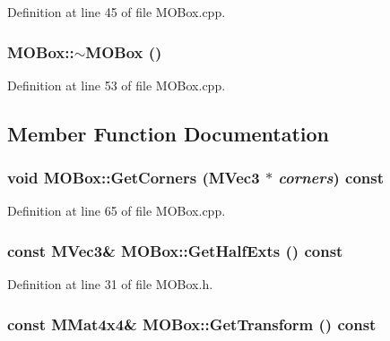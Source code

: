 Definition at line 45 of file MOBox.cpp.\hypertarget{class_m_o_box_5d831d82a6f18ceb4ded4f0aead4d37e}{
\subsubsection[{$\sim$MOBox}]{\setlength{\rightskip}{0pt plus 5cm}MOBox::$\sim$MOBox ()}}
\label{class_m_o_box_5d831d82a6f18ceb4ded4f0aead4d37e}




Definition at line 53 of file MOBox.cpp.

\subsection{Member Function Documentation}
\hypertarget{class_m_o_box_d4ab62fb0cb55df4774b656c8c99e51f}{
\subsubsection[{GetCorners}]{\setlength{\rightskip}{0pt plus 5cm}void MOBox::GetCorners ({\bf MVec3} $\ast$ {\em corners}) const}}
\label{class_m_o_box_d4ab62fb0cb55df4774b656c8c99e51f}




Definition at line 65 of file MOBox.cpp.\hypertarget{class_m_o_box_1f3cab4b1e09c90769183721f3e3d06b}{
\subsubsection[{GetHalfExts}]{\setlength{\rightskip}{0pt plus 5cm}const {\bf MVec3}\& MOBox::GetHalfExts () const}}
\label{class_m_o_box_1f3cab4b1e09c90769183721f3e3d06b}




Definition at line 31 of file MOBox.h.\hypertarget{class_m_o_box_1460a55261c4b5dbd9238e8c5c7371f4}{
\subsubsection[{GetTransform}]{\setlength{\rightskip}{0pt plus 5cm}const {\bf MMat4x4}\& MOBox::GetTransform () const}}
\label{class_m_o_box_1460a55261c4b5dbd9238e8c5c7371f4}




